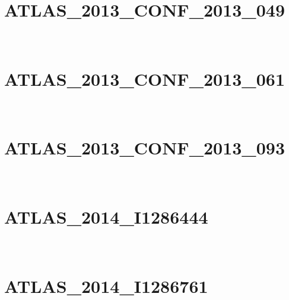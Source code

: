 \documentclass[12pt]{article}
\begin{document}

\newpage\newpage~\newpage\section{ATLAS\_2013\_CONF\_2013\_049}


\newpage
\newpage
\newpage
\newpage
\newpage
\newpage
\newpage
\newpage
\newpage\newpage~\newpage\section{ATLAS\_2013\_CONF\_2013\_061}


\newpage
\newpage
\newpage\newpage~\newpage\section{ATLAS\_2013\_CONF\_2013\_093}


\newpage
\newpage\newpage~\newpage\section{ATLAS\_2014\_I1286444}


\newpage
\newpage
\newpage
\newpage\newpage~\newpage\section{ATLAS\_2014\_I1286761}


\newpage
\newpage
\newpage
\newpage
\newpage
\newpage
\newpage
\newpage
\newpage
\newpage
\newpage\newpage~\newpage
        
        
\end{document}
